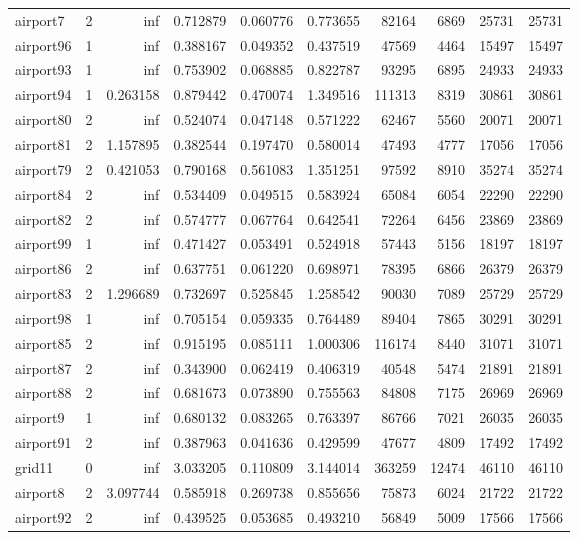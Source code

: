 \begin{longtable}{|l|r|r|r|r|r|r|r|r|r|}
airport7 & 2 & inf & 0.712879 & 0.060776 & 0.773655 & 82164 & 6869 & 25731 & 25731 \\
airport96 & 1 & inf & 0.388167 & 0.049352 & 0.437519 & 47569 & 4464 & 15497 & 15497 \\
airport93 & 1 & inf & 0.753902 & 0.068885 & 0.822787 & 93295 & 6895 & 24933 & 24933 \\
airport94 & 1 & 0.263158 & 0.879442 & 0.470074 & 1.349516 & 111313 & 8319 & 30861 & 30861 \\
airport80 & 2 & inf & 0.524074 & 0.047148 & 0.571222 & 62467 & 5560 & 20071 & 20071 \\
airport81 & 2 & 1.157895 & 0.382544 & 0.197470 & 0.580014 & 47493 & 4777 & 17056 & 17056 \\
airport79 & 2 & 0.421053 & 0.790168 & 0.561083 & 1.351251 & 97592 & 8910 & 35274 & 35274 \\
airport84 & 2 & inf & 0.534409 & 0.049515 & 0.583924 & 65084 & 6054 & 22290 & 22290 \\
airport82 & 2 & inf & 0.574777 & 0.067764 & 0.642541 & 72264 & 6456 & 23869 & 23869 \\
airport99 & 1 & inf & 0.471427 & 0.053491 & 0.524918 & 57443 & 5156 & 18197 & 18197 \\
airport86 & 2 & inf & 0.637751 & 0.061220 & 0.698971 & 78395 & 6866 & 26379 & 26379 \\
airport83 & 2 & 1.296689 & 0.732697 & 0.525845 & 1.258542 & 90030 & 7089 & 25729 & 25729 \\
airport98 & 1 & inf & 0.705154 & 0.059335 & 0.764489 & 89404 & 7865 & 30291 & 30291 \\
airport85 & 2 & inf & 0.915195 & 0.085111 & 1.000306 & 116174 & 8440 & 31071 & 31071 \\
airport87 & 2 & inf & 0.343900 & 0.062419 & 0.406319 & 40548 & 5474 & 21891 & 21891 \\
airport88 & 2 & inf & 0.681673 & 0.073890 & 0.755563 & 84808 & 7175 & 26969 & 26969 \\
airport9 & 1 & inf & 0.680132 & 0.083265 & 0.763397 & 86766 & 7021 & 26035 & 26035 \\
airport91 & 2 & inf & 0.387963 & 0.041636 & 0.429599 & 47677 & 4809 & 17492 & 17492 \\
grid11 & 0 & inf & 3.033205 & 0.110809 & 3.144014 & 363259 & 12474 & 46110 & 46110 \\
airport8 & 2 & 3.097744 & 0.585918 & 0.269738 & 0.855656 & 75873 & 6024 & 21722 & 21722 \\
airport92 & 2 & inf & 0.439525 & 0.053685 & 0.493210 & 56849 & 5009 & 17566 & 17566 \\

\end{longtable}
